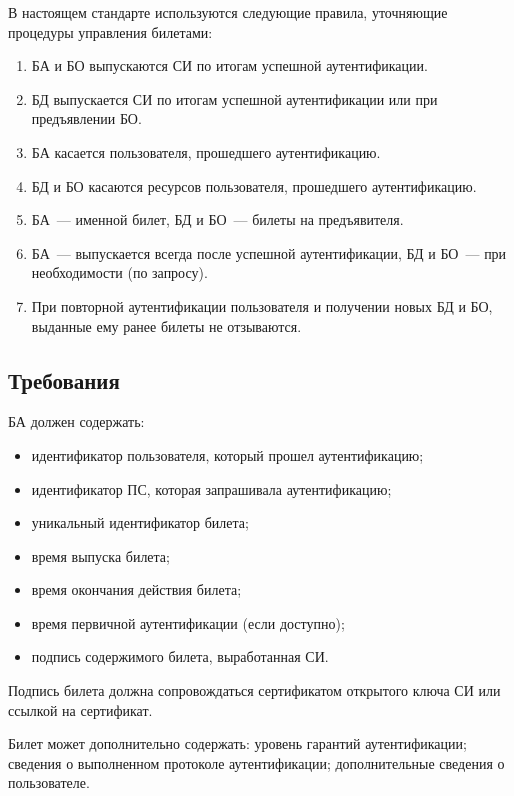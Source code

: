 В настоящем стандарте используются следующие правила,
уточняющие процедуры управления билетами:
\begin{enumerate}
\item
БА и БО выпускаются СИ по итогам успешной аутентификации. 
\item
БД выпускается СИ по итогам успешной аутентификации или при предъявлении БО. 
\item
БА касается пользователя, прошедшего аутентификацию. 
\item
БД и БО касаются ресурсов пользователя, прошедшего аутентификацию. 
\item
БА~--- именной билет, БД и БО~--- билеты на предъявителя.
\item
БА~--- выпускается всегда после успешной аутентификации, 
БД и БО~--- при необходимости (по запросу).
\item
При повторной аутентификации пользователя и получении новых БД и БО, 
выданные ему ранее билеты не отзываются.
\end{enumerate}
\fi

\subsection{Требования}\label{TM.Reqs}


БА должен содержать:
\begin{itemize}
\item
идентификатор пользователя, который прошел аутентификацию;
\item
идентификатор ПС, которая запрашивала аутентификацию;
\item
уникальный идентификатор билета;
\item
время выпуска билета;
\item
время окончания действия билета;
\item
время первичной аутентификации (если доступно);
\item
подпись содержимого билета, выработанная СИ.
\end{itemize}

Подпись билета должна сопровождаться сертификатом открытого ключа СИ или 
ссылкой на сертификат.  

\begin{note}
Билет может дополнительно содержать: 
уровень гарантий аутентификации;
сведения о выполненном протоколе аутентификации;
дополнительные сведения о пользователе.
\end{note}

